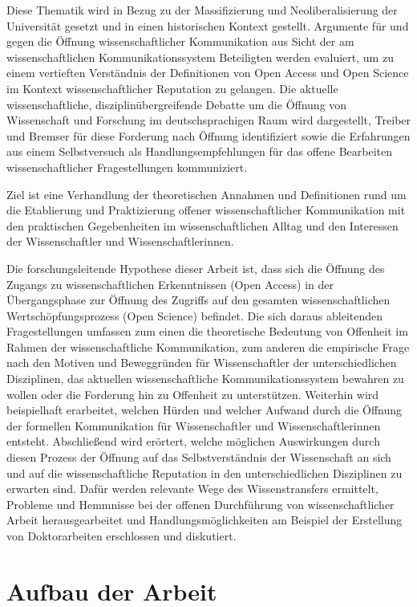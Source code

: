 Diese Thematik wird in Bezug zu der Massifizierung und Neoliberalisierung der Universität gesetzt und in einen historischen Kontext gestellt. Argumente für und gegen die Öffnung wissenschaftlicher Kommunikation aus Sicht der am wissenschaftlichen Kommunikationssystem Beteiligten werden evaluiert, um zu einem vertieften Verständnis der Definitionen von Open Access und Open Science im Kontext wissenschaftlicher Reputation zu gelangen. Die aktuelle wissenschaftliche, disziplinübergreifende Debatte um die Öffnung von Wissenschaft und Forschung im deutschsprachigen Raum wird dargestellt, Treiber und Bremser für diese Forderung nach Öffnung identifiziert sowie die Erfahrungen aus einem Selbstversuch als Handlungsempfehlungen für das offene Bearbeiten wissenschaftlicher Fragestellungen kommuniziert.

Ziel ist eine Verhandlung der theoretischen Annahmen und Definitionen rund um die Etablierung und Praktizierung offener wissenschaftlicher Kommunikation mit den praktischen Gegebenheiten im wissenschaftlichen Alltag und den Interessen der Wissenschaftler und Wissenschaftlerinnen.

Die forschungsleitende Hypothese dieser Arbeit ist, dass sich die Öffnung des Zugangs zu wissenschaftlichen Erkenntnissen (Open Access) in der Übergangsphase zur Öffnung des Zugriffs auf den gesamten wissenschaftlichen Wertschöpfungsprozess (Open Science) befindet. Die sich daraus ableitenden Fragestellungen umfassen zum einen die theoretische Bedeutung von Offenheit im Rahmen der wissenschaftliche Kommunikation, zum anderen die empirische Frage nach den Motiven und Beweggründen für Wissenschaftler der unterschiedlichen Disziplinen, das aktuellen wissenschaftliche Kommunikationssystem bewahren zu wollen oder die Forderung hin zu Offenheit zu unterstützen. Weiterhin wird beispielhaft erarbeitet, welchen Hürden und welcher Aufwand durch die Öffnung der formellen Kommunikation für Wissenschaftler und Wissenschaftlerinnen entsteht. Abschließend wird erörtert, welche möglichen Auswirkungen durch diesen Prozess der Öffnung auf das Selbstverständnis der Wissenschaft an sich und auf die wissenschaftliche Reputation in den unterschiedlichen Disziplinen zu erwarten sind. Dafür werden relevante Wege des Wissenstransfers ermittelt, Probleme und Hemmnisse bei der offenen Durchführung von wissenschaftlicher Arbeit herausgearbeitet und Handlungsmöglichkeiten am Beispiel der Erstellung von Doktorarbeiten erschlossen und diskutiert.

\section{Aufbau der Arbeit}

